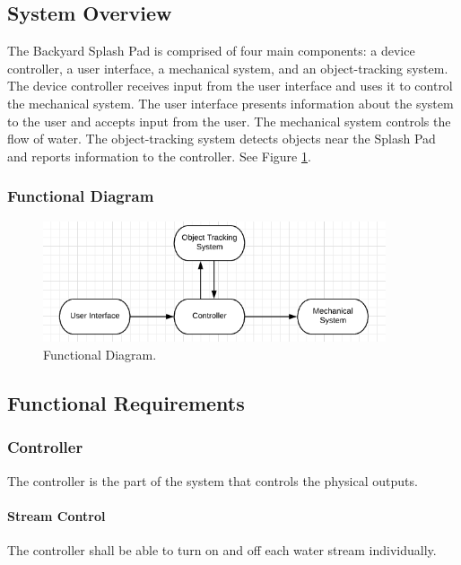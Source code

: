 \subsection{System Overview} 
The Backyard Splash Pad is comprised of four main components: a device controller, a user interface, a mechanical system, and an object-tracking system. 
The device controller receives input from the user interface and uses it to control the mechanical system.
The user interface presents information about the system to the user and accepts input from the user.
The mechanical system controls the flow of water. 
The object-tracking system detects objects near the Splash Pad and reports information to the controller. 
See Figure \ref{fig:functional_diagram}.

\subsubsection{Functional Diagram}

\begin{figure}[h]
\centering
\includegraphics[width=0.9\textwidth]{Functional_Diagram.png}
\caption{\label{fig:functional_diagram}Functional Diagram.}
\end{figure}

\subsection{Functional Requirements}

\subsubsection{Controller}
The controller is the part of the system that controls the physical outputs. 

\paragraph{Stream Control}
The controller shall be able to turn on and off each water stream individually.

